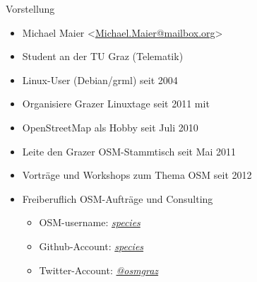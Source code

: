 \documentclass{beamer}
\begin{document}
\begin{frame}{Vorstellung}

  \begin{itemize}
    \item Michael Maier \textless \href{mailto:Michael.Maier@mailbox.org}{Michael.Maier@mailbox.org}\textgreater
    \item Student an der TU Graz (Telematik)
\vspace{0.3cm}
    \item Linux-User (Debian/grml) seit 2004
    \item Organisiere Grazer Linuxtage seit 2011 mit
    \item OpenStreetMap als Hobby seit Juli 2010
    \item Leite den Grazer OSM-Stammtisch seit Mai 2011
\vspace{0.3cm}
    \item Vorträge und Workshops zum Thema OSM seit 2012
    \item Freiberuflich OSM-Aufträge und Consulting
    \begin{itemize}
      \item OSM-username: \emph{\href{http://www.openstreetmap.org/user/species}{species}}
      \item Github-Account: \emph{\href{https://github.com/species}{species}}
      \item Twitter-Account: \emph{\href{https://twitter.com/osmgraz}{@osmgraz}}
    \end{itemize}
  \end{itemize}
\end{frame}


\end{document}
